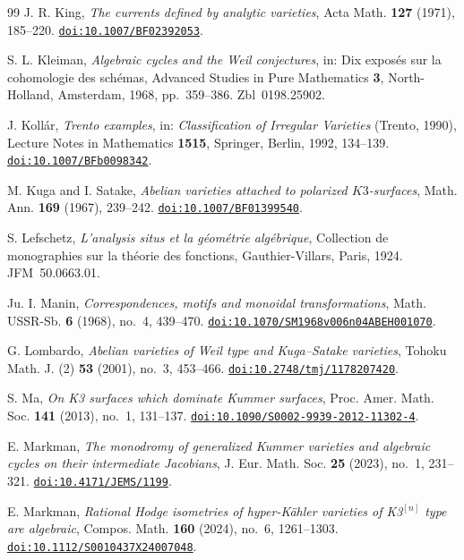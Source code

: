 \documentclass[11pt,reqno]{amsart}
\numberwithin{equation}{section}
\theoremstyle{plain}
\theoremstyle{definition}
\begin{document}
\begin{thebibliography}{99}
J. R. King,
\emph{The currents defined by analytic varieties},
Acta Math. \textbf{127} (1971), 185--220.
\href{https://doi.org/10.1007/BF02392053}{\nolinkurl{doi:10.1007/BF02392053}}.

S. L. Kleiman,
\emph{Algebraic cycles and the Weil conjectures},
in: Dix expos\'es sur la cohomologie des sch\'emas,
Advanced Studies in Pure Mathematics \textbf{3}, North-Holland, Amsterdam, 1968, pp.~359--386. Zbl~0198.25902.

J. Koll\'ar,
\emph{Trento examples},
in: \emph{Classification of Irregular Varieties} (Trento, 1990),
Lecture Notes in Mathematics \textbf{1515}, Springer, Berlin, 1992, 134--139.
\href{https://doi.org/10.1007/BFb0098342}{\nolinkurl{doi:10.1007/BFb0098342}}.

M. Kuga and I. Satake,
\emph{Abelian varieties attached to polarized $K3$-surfaces},
Math. Ann. \textbf{169} (1967), 239--242.
\href{https://doi.org/10.1007/BF01399540}{\nolinkurl{doi:10.1007/BF01399540}}.

S. Lefschetz,
\emph{L'analysis situs et la g\'eom\'etrie alg\'ebrique},
Collection de monographies sur la th\'eorie des fonctions, Gauthier-Villars, Paris, 1924. JFM~50.0663.01.

Ju. I. Manin,
\emph{Correspondences, motifs and monoidal transformations},
Math. USSR-Sb. \textbf{6} (1968), no.~4, 439--470.
\href{https://doi.org/10.1070/SM1968v006n04ABEH001070}{\nolinkurl{doi:10.1070/SM1968v006n04ABEH001070}}.

G. Lombardo,
\emph{Abelian varieties of Weil type and Kuga--Satake varieties},
Tohoku Math. J. (2) \textbf{53} (2001), no.~3, 453--466.
\href{https://doi.org/10.2748/tmj/1178207420}{\nolinkurl{doi:10.2748/tmj/1178207420}}.

S. Ma,
\emph{On K3 surfaces which dominate Kummer surfaces},
Proc. Amer. Math. Soc. \textbf{141} (2013), no.~1, 131--137.
\href{https://doi.org/10.1090/S0002-9939-2012-11302-4}{\nolinkurl{doi:10.1090/S0002-9939-2012-11302-4}}.

E. Markman,
\emph{The monodromy of generalized Kummer varieties and algebraic cycles on their intermediate Jacobians},
J. Eur. Math. Soc. \textbf{25} (2023), no.~1, 231--321.
\href{https://doi.org/10.4171/JEMS/1199}{\nolinkurl{doi:10.4171/JEMS/1199}}.

E. Markman,
\emph{Rational Hodge isometries of hyper-K\"ahler varieties of K3$^{[n]}$
type are algebraic},
Compos. Math. \textbf{160} (2024), no.~6, 1261--1303.
\href{https://doi.org/10.1112/S0010437X24007048}{\nolinkurl{doi:10.1112/S0010437X24007048}}.


\end{thebibliography}
\end{document}
